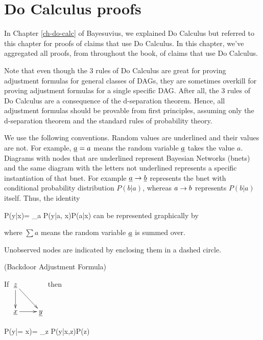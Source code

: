 \chapter{Do Calculus proofs}
\label{ch-do-calc-proofs}

In Chapter \ref{ch-do-calc}
of Bayesuvius,
we explained Do Calculus
but referred to this
chapter for proofs
of claims that
use Do Calculus.
In this chapter, we've
aggregated
 all proofs, from
throughout the book,
of claims that use Do Calculus.

Note that even though the 3
rules of Do Calculus
are great for proving
adjustment formulas
for general classes of DAGs,
they are sometimes overkill
for proving
 adjustment formulas
for a single specific DAG.
After all,  the
 3 rules of Do Calculus
are a consequence
of the d-separation theorem.
Hence, all adjustment
formulas should be
provable from first principles,
assuming only
the d-separation theorem
and the standard rules of
probability theory.

We use the
 following conventions.
Random values are underlined
and their values are not.
For example, ${\underline{a}}=a$ means
the random variable
${\underline{a}}$ takes the value $a$.
Diagrams
with nodes that are
underlined represent
Bayesian Networks (bnets)
and the same diagram
with the letters not underlined
represents a specific
instantiation of that bnet.
For example ${\underline{a}}\rightarrow{\underline{b}}$
represents the bnet with
conditional probability distribution
$P(b|a)$,
whereas  $a\rightarrow b$
represents $P(b|a)$ itself.
Thus, the identity

\beq
P(y|x)= \sum_a P(y|a, x)P(a|x)
\eeq
can be represented graphically
by

\beq
{}
\eeq
where $\sum a$
means the random variable
${\underline{a}}$ is summed over.

Unobserved nodes are
indicated by enclosing them
in a dashed circle.

\begin{claim} (Backdoor
Adjustment Formula)
\label{cl-backdoor-proof}

If
$
\xymatrix{
{\rvz}\ar[d]\ar[rd]
\\
\rvx\ar[r]&\rvy
}$
then

\beq
P(y|\cald \rvx = x)=
\sum_z
P(y|x,z)P(z)
\eeq
\beq
{}
\eeq
\end{claim}

